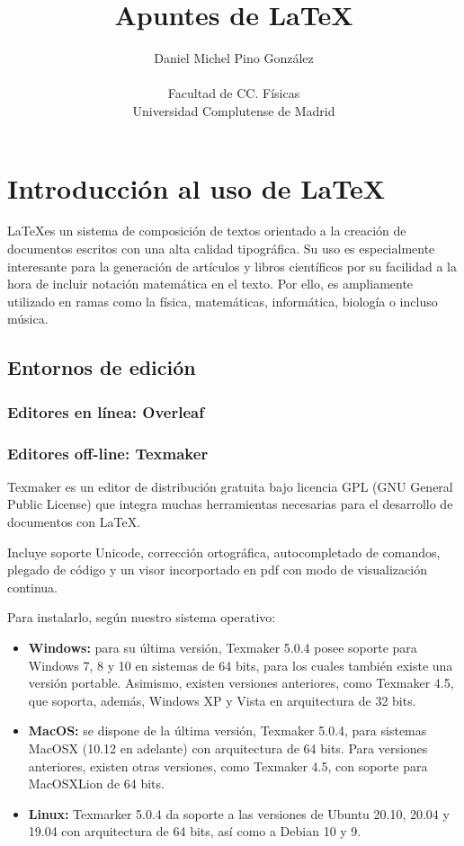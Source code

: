 \documentclass{article}
\title{Apuntes de \LaTeX}
\author{Daniel Michel Pino González\\
\\
Facultad de CC. Físicas\\					
Universidad Complutense de Madrid}
\begin{document}
\maketitle
\thispagestyle{empty}
\clearpage

\section{Introducción al uso de \LaTeX}

\LaTeX es un sistema de composición de textos orientado a la creación de documentos escritos con una alta calidad tipográfica. Su uso es especialmente interesante para la generación de artículos y libros científicos por su facilidad a la hora de incluir notación matemática en el texto. Por ello, es ampliamente utilizado en ramas como la física, matemáticas, informática, biología o incluso música.

\subsection{Entornos de edición}

\subsubsection{Editores en línea: Overleaf}

\subsubsection{Editores off-line: Texmaker}

Texmaker es un editor de distribución gratuita bajo licencia GPL (GNU General Public License) que integra muchas herramientas necesarias para el desarrollo de documentos con \LaTeX.

Incluye soporte Unicode, corrección ortográfica, autocompletado de comandos, plegado de código y un visor incorportado en pdf con modo de visualización continua.

Para instalarlo, según nuestro sistema operativo:

\begin{itemize}

\item \textbf{Windows:} para su última versión, Texmaker 5.0.4 posee soporte para Windows 7, 8 y 10 en sistemas de 64 bits, para los cuales también existe una versión portable. Asimismo, existen versiones anteriores, como Texmaker 4.5, que soporta, además, Windows XP y Vista en arquitectura de 32 bits.

\item \textbf{MacOS:} se dispone de la última versión, Texmaker 5.0.4, para sistemas MacOSX (10.12 en adelante) con arquitectura de 64 bits. Para versiones anteriores, existen otras versiones, como Texmaker 4.5, con soporte para MacOSXLion de 64 bits.

\item \textbf{Linux:} Texmarker 5.0.4 da soporte a las versiones de Ubuntu 20.10, 20.04 y 19.04 con arquitectura de 64 bits, así como a Debian 10 y 9.

\bigskip

\end{itemize}
\end{document}
